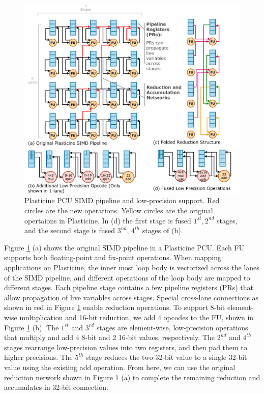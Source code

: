 \begin{figure}
  \centering
  \includegraphics[width=1\columnwidth]{figs/lowprec.pdf}
  \caption{Plasticine PCU SIMD pipeline and low-precision support.
  Red circles are the new operations. Yellow circles are the original opertaions in Plasticine.
  In (d) the first stage is fused $1^{st}, 2^{nd}$ stages, and the second stage is fused
  $3^{nd}$, $4^{th}$ stages of (b).
   }
  \label{fig:lowprec}
  \vspace*{-0.3in}
\end{figure}
Figure \ref{fig:lowprec} (a) shows the original SIMD pipeline in a Plasticine PCU.
Each FU supports both floating-point and fix-point operations.
When mapping applications on Plasticine,
  the inner most loop body is vectorized across the lanes of the
SIMD pipeline, and different operations of the loop body are mapped to different stages.
Each pipeline stage contains a few pipeline registers (PRs)
  that allow propagation of live variables across stages.
Special cross-lane connections as shown in red in Figure \ref{fig:lowprec} enable reduction operations.
To support 8-bit element-wise multiplication and 16-bit reduction, we add 4 opcodes to the FU, shown in
Figure \ref{fig:lowprec} (b).
The $1^{st}$ and $3^{rd}$ stages are element-wise, low-precision operations
  that multiply and add 4 8-bit and 2 16-bit values, respectively.
The $2^{nd}$ and $4^{th}$ stages rearrange low-precision values into two registers,
  and then pad them to higher precisions.
The $5^{th}$ stage reduces the two 32-bit value to a single 32-bit value using the existing add operation. 
From here, we can use the original
reduction network shown in Figure \ref{fig:lowprec} (a) to complete the remaining reduction and accumulates
in 32-bit connection.

